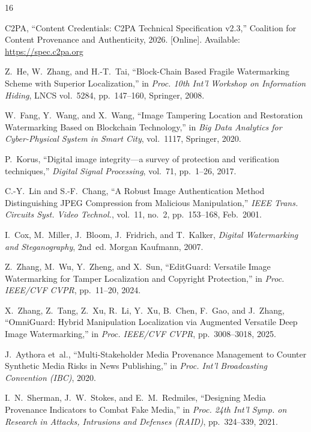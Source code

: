 \documentclass[conference]{IEEEtran}
\begin{document}
\begin{thebibliography}{16}

  C2PA, ``Content Credentials: C2PA Technical Specification v2.3,''
  Coalition for Content Provenance and Authenticity, 2026. [Online].
  Available: \url{https://spec.c2pa.org}

  Z.~He, W.~Zhang, and H.-T.~Tai,
  ``Block-Chain Based Fragile Watermarking Scheme with Superior
  Localization,''
  in \emph{Proc. 10th Int'l Workshop on Information Hiding},
  LNCS vol.~5284, pp.~147--160, Springer, 2008.

  W.~Fang, Y.~Wang, and X.~Wang,
  ``Image Tampering Location and Restoration Watermarking Based on
  Blockchain Technology,''
  in \emph{Big Data Analytics for Cyber-Physical System in Smart City},
  vol.~1117, Springer, 2020.

  P.~Korus,
  ``Digital image integrity---a survey of protection and verification
  techniques,''
  \emph{Digital Signal Processing}, vol.~71, pp.~1--26, 2017.

  C.-Y.~Lin and S.-F.~Chang,
  ``A Robust Image Authentication Method Distinguishing JPEG Compression
  from Malicious Manipulation,''
  \emph{IEEE Trans. Circuits Syst. Video Technol.},
  vol.~11, no.~2, pp.~153--168, Feb.~2001.

  I.~Cox, M.~Miller, J.~Bloom, J.~Fridrich, and T.~Kalker,
  \emph{Digital Watermarking and Steganography}, 2nd~ed.
  Morgan Kaufmann, 2007.

  Z.~Zhang, M.~Wu, Y.~Zheng, and X.~Sun,
  ``EditGuard: Versatile Image Watermarking for Tamper Localization
  and Copyright Protection,''
  in \emph{Proc. IEEE/CVF CVPR}, pp.~11--20, 2024.

  X.~Zhang, Z.~Tang, Z.~Xu, R.~Li, Y.~Xu, B.~Chen, F.~Gao, and J.~Zhang,
  ``OmniGuard: Hybrid Manipulation Localization via Augmented Versatile
  Deep Image Watermarking,''
  in \emph{Proc. IEEE/CVF CVPR}, pp.~3008--3018, 2025.

  J.~Aythora et~al.,
  ``Multi-Stakeholder Media Provenance Management to Counter Synthetic
  Media Risks in News Publishing,''
  in \emph{Proc. Int'l Broadcasting Convention (IBC)}, 2020.

  I.~N.~Sherman, J.~W.~Stokes, and E.~M.~Redmiles,
  ``Designing Media Provenance Indicators to Combat Fake Media,''
  in \emph{Proc. 24th Int'l Symp. on Research in Attacks, Intrusions
  and Defenses (RAID)}, pp.~324--339, 2021.


\end{thebibliography}
\end{document}

